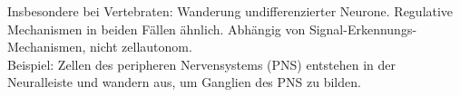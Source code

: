 \documentclass[12pt,a4paper]{article}
\begin{document}
Insbesondere bei Vertebraten: Wanderung undifferenzierter Neurone.
Regulative Mechanismen in beiden Fällen ähnlich. Abhängig von Signal-Erkennungs-Mechanismen, nicht zellautonom.\\

Beispiel: Zellen des peripheren Nervensystems (PNS) entstehen in der Neuralleiste und wandern aus, um Ganglien des PNS zu bilden.\\
\end{document}
